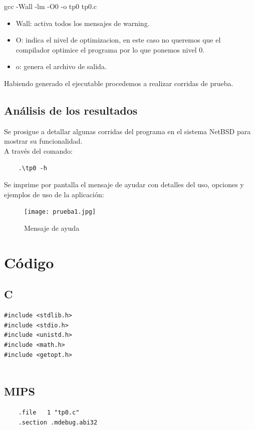 \documentclass[a4paper,11pt]{article}
\begin{document}
	gcc -Wall -lm -O0 -o tp0 tp0.c

\begin{itemize}
\item	Wall: activa todos los mensajes de warning.

\item	O: indica el nivel de optimizacion, en este caso no queremos que el compilador optimice el programa por lo que ponemos nivel 0.

\item	o: genera el archivo de salida.

\end{itemize}

Habiendo generado el ejecutable procedemos a realizar corridas de prueba. \\

\newpage

\subsection {An\'alisis de los resultados}

Se prosigue a detallar algunas corridas del programa en el sistema NetBSD para mostrar su funcionalidad.  \\
A trav\'es del comando: 

\begin{verbatim}
	.\tp0 -h
\end{verbatim}

Se imprime por pantalla el mensaje de ayudar con detalles del uso, opciones y ejemplos de uso de la aplicaci\'on: 

\begin{figure}[h]
\centering
\texttt{[image: prueba1.jpg]}
\caption{Mensaje de ayuda}
\end{figure}

\newpage


\section{C\'odigo}
\subsection{C}

\begin{verbatim}
#include <stdlib.h>
#include <stdio.h>
#include <unistd.h>
#include <math.h>
#include <getopt.h>


\end{verbatim}


\newpage
\subsection{MIPS}

\begin{verbatim}
	.file	1 "tp0.c"
	.section .mdebug.abi32

\end{verbatim}
\end{document}
